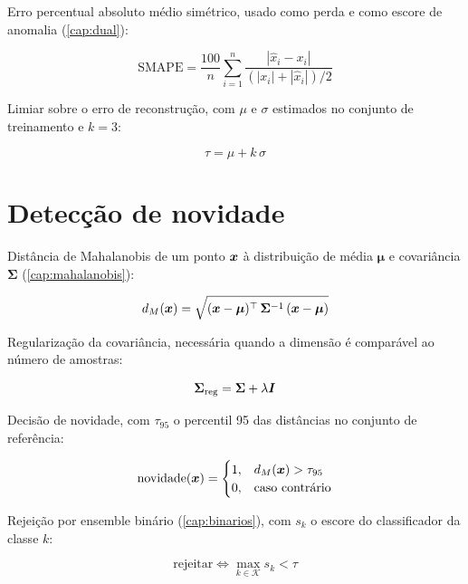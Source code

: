 Erro percentual absoluto médio simétrico, usado como perda e como escore de anomalia
(\cref{cap:dual}):

\begin{equation}
\text{SMAPE} = \frac{100}{n} \sum_{i=1}^{n}
\frac{|\hat{x}_i - x_i|}{(|x_i| + |\hat{x}_i|)/2}
\label{eq:for-smape}
\end{equation}

Limiar sobre o erro de reconstrução, com $\mu$ e $\sigma$ estimados no conjunto de
treinamento e $k = 3$:

\begin{equation}
\tau = \mu + k\,\sigma
\label{eq:for-limiar}
\end{equation}

\section{Detecção de novidade}

Distância de Mahalanobis de um ponto $\bm{x}$ à distribuição de média $\bm{\mu}$ e
covariância $\bm{\Sigma}$ (\cref{cap:mahalanobis}):

\begin{equation}
d_M(\bm{x}) = \sqrt{(\bm{x} - \bm{\mu})^{\top}\,
\bm{\Sigma}^{-1}\,(\bm{x} - \bm{\mu})}
\label{eq:for-mahalanobis}
\end{equation}

Regularização da covariância, necessária quando a dimensão é comparável ao número de
amostras:

\begin{equation}
\bm{\Sigma}_{\text{reg}} = \bm{\Sigma} + \lambda \bm{I}
\label{eq:for-sigmareg}
\end{equation}

Decisão de novidade, com $\tau_{95}$ o percentil 95 das distâncias no conjunto de
referência:

\begin{equation}
\text{novidade}(\bm{x}) =
\begin{cases}
1, & d_M(\bm{x}) > \tau_{95} \\
0, & \text{caso contrário}
\end{cases}
\label{eq:for-decisao}
\end{equation}

Rejeição por ensemble binário (\cref{cap:binarios}), com $s_k$ o escore do classificador
da classe $k$:

\begin{equation}
\text{rejeitar} \iff \max_{k \in \mathcal{K}} s_k < \tau
\label{eq:for-rejeicao}
\end{equation}

